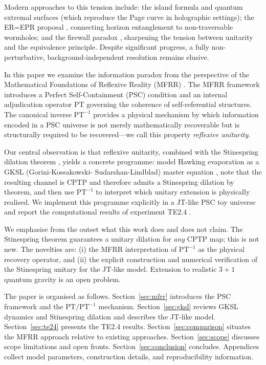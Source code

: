 \documentclass[11pt,twocolumn]{article}
\theoremstyle{remark}
\begin{document}
Modern approaches to this tension include:
the island formula and quantum extremal surfaces
\cite{Penington2020,AlmheiriEngelhartsMarolfMaxfield2019}
(which reproduce the Page curve in holographic settings);
the ER=EPR proposal \cite{MaldacenaSusskind2013}, connecting horizon
entanglement to non-traversable wormholes; and the firewall paradox
\cite{AlmheiriMarolfPolchinskiSully2013}, sharpening the tension
between unitarity and the equivalence principle. Despite significant
progress, a fully non-perturbative, background-independent resolution
remains elusive.

In this paper we examine the information paradox from the perspective
of the Mathematical Foundations of Reflexive Reality (MFRR)
\cite{SpivackNEMSMFRRBridge,SpivackPhysicsPortal}. The MFRR framework
introduces a Perfect Self-Containment (PSC) condition and an
internal adjudication operator $\mathrm{PT}$ governing the coherence
of self-referential structures. The canonical inverse $\mathrm{PT}^{-1}$
provides a physical mechanism by which information encoded in a PSC
universe is not merely mathematically recoverable but is structurally
required to be recovered---we call this property \emph{reflexive
unitarity}.

Our central observation is that reflexive unitarity, combined with the
Stinespring dilation theorem \cite{Stinespring1955}, yields a concrete
programme: model Hawking evaporation as a GKSL (Gorini-Kossakowski-
Sudarshan-Lindblad) master equation \cite{Gorini1976,Lindblad1976},
note that the resulting channel is CPTP and therefore admits a
Stinespring dilation by theorem, and then use $\mathrm{PT}^{-1}$ to
interpret which unitary extension is physically realised. We implement
this programme explicitly in a JT-like \cite{JackiwTeitelboim1985,Teitelboim1983}
PSC toy universe and report the computational results of experiment TE2.4
\cite{SpivackBHUnitarity}.

We emphasise from the outset what this work does and does not claim.
The Stinespring theorem guarantees a unitary dilation for \emph{any}
CPTP map; this is not new. The novelties are: (i) the MFRR
interpretation of $\mathrm{PT}^{-1}$ as the physical recovery operator,
and (ii) the explicit construction and numerical verification of the
Stinespring unitary for the JT-like model. Extension to realistic
$3{+}1$ quantum gravity is an open problem.

The paper is organised as follows. Section~\ref{sec:mfrr} introduces
the PSC framework and the $\mathrm{PT}/\mathrm{PT}^{-1}$ mechanism.
Section~\ref{sec:gksl} reviews GKSL dynamics and Stinespring dilation
and describes the JT-like model. Section~\ref{sec:te24} presents the
TE2.4 results. Section~\ref{sec:comparison} situates the MFRR approach
relative to existing approaches. Section~\ref{sec:scope} discusses scope
limitations and open fronts. Section~\ref{sec:conclusion} concludes.
Appendices collect model parameters, construction details, and
reproducibility information.
\end{document}
